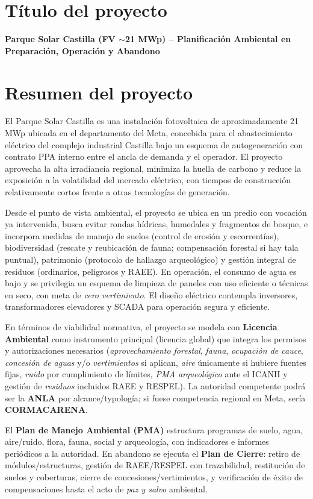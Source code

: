 \section{Título del proyecto}
\textbf{Parque Solar Castilla (FV $\sim$21 MWp) -- Planificación Ambiental en Preparación, Operación y Abandono}

\section{Resumen del proyecto}
El Parque Solar Castilla es una instalación fotovoltaica de aproximadamente 21 MWp ubicada en el departamento del Meta, concebida para el abastecimiento eléctrico del complejo industrial Castilla bajo un esquema de autogeneración con contrato PPA interno entre el ancla de demanda y el operador. El proyecto aprovecha la alta irradiancia regional, minimiza la huella de carbono y reduce la exposición a la volatilidad del mercado eléctrico, con tiempos de construcción relativamente cortos frente a otras tecnologías de generación.

Desde el punto de vista ambiental, el proyecto se ubica en un predio con vocación ya intervenida, busca evitar rondas hídricas, humedales y fragmentos de bosque, e incorpora medidas de manejo de suelos (control de erosión y escorrentías), biodiversidad (rescate y reubicación de fauna; compensación forestal si hay tala puntual), patrimonio (protocolo de hallazgo arqueológico) y gestión integral de residuos (ordinarios, peligrosos y RAEE). En operación, el consumo de agua es bajo y se privilegia un esquema de limpieza de paneles con uso eficiente o técnicas en seco, con meta de \textit{cero vertimiento}. El diseño eléctrico contempla inversores, transformadores elevadores y SCADA para operación segura y eficiente.

En términos de viabilidad normativa, el proyecto se modela con \textbf{Licencia Ambiental} como instrumento principal (licencia global) que integra los permisos y autorizaciones necesarios (\emph{aprovechamiento forestal}, \emph{fauna}, \emph{ocupación de cauce}, \emph{concesión de aguas} y/o \emph{vertimientos} si aplican, \emph{aire} únicamente si hubiere fuentes fijas, \emph{ruido} por cumplimiento de límites, \emph{PMA arqueológico} ante el ICANH y gestión de \emph{residuos} incluidos RAEE y RESPEL). La autoridad competente podrá ser la \textbf{ANLA} por alcance/typología; si fuese competencia regional en Meta, sería \textbf{CORMACARENA}.

El \textbf{Plan de Manejo Ambiental (PMA)} estructura programas de suelo, agua, aire/ruido, flora, fauna, social y arqueología, con indicadores e informes periódicos a la autoridad. En abandono se ejecuta el \textbf{Plan de Cierre}: retiro de módulos/estructuras, gestión de RAEE/RESPEL con trazabilidad, restitución de suelos y coberturas, cierre de concesiones/vertimientos, y verificación de éxito de compensaciones hasta el acto de \textit{paz y salvo} ambiental.

